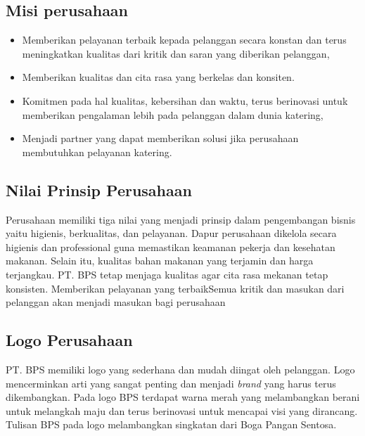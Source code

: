 \subsection{Misi perusahaan}
\begin{itemize}
\item Memberikan pelayanan terbaik kepada pelanggan secara konstan 
dan terus meningkatkan kualitas dari kritik dan saran yang diberikan pelanggan,
\item Memberikan kualitas dan cita rasa yang berkelas dan konsiten. 
\item Komitmen pada hal kualitas, kebersihan dan waktu, terus 
berinovasi untuk memberikan pengalaman lebih pada pelanggan dalam dunia katering, 
\item Menjadi partner yang dapat memberikan solusi jika perusahaan membutuhkan pelayanan katering.
\end{itemize}

\subsection{Nilai Prinsip Perusahaan}
 Perusahaan memiliki tiga nilai yang menjadi prinsip dalam pengembangan bisnis yaitu higienis, 
 berkualitas, dan pelayanan. Dapur perusahaan dikelola secara higienis dan professional guna memastikan 
 keamanan pekerja dan kesehatan makanan. Selain itu, kualitas bahan makanan yang terjamin dan harga terjangkau. 
 PT. BPS tetap menjaga kualitas agar cita rasa mekanan tetap konsisten. Memberikan pelayanan yang terbaikSemua 
 kritik dan masukan dari pelanggan akan menjadi masukan bagi perusahaan

 \subsection{Logo Perusahaan}
 PT. BPS memiliki logo yang sederhana dan mudah diingat oleh pelanggan. 
 Logo mencerminkan arti yang sangat penting dan menjadi \emph{brand} yang harus terus dikembangkan. 
 Pada logo BPS terdapat warna merah yang melambangkan berani untuk 
 melangkah maju dan terus berinovasi untuk mencapai visi yang dirancang. 
 Tulisan BPS pada logo melambangkan singkatan dari Boga Pangan Sentosa.

